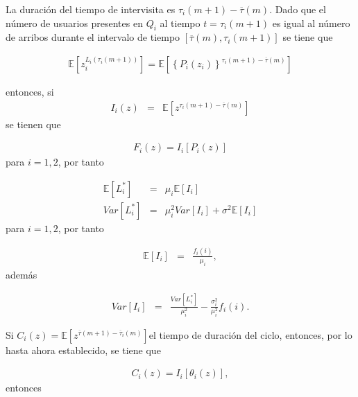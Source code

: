 \documentclass{article}
\newcommand{\esp}{\mathbb{E}}
\numberwithin{equation}{section}
\begin{document}
La duraci\'on del tiempo de intervisita es $\tau_{i}\left(m+1\right)-\overline{\tau}\left(m\right)$. Dado que el n\'umero de usuarios presentes en $Q_{i}$ al tiempo $t=\tau_{i}\left(m+1\right)$ es igual al n\'umero de arribos durante el intervalo de tiempo $\left[\overline{\tau}\left(m\right),\tau_{i}\left(m+1\right)\right]$ se tiene que


\begin{eqnarray*}
\esp\left[z_{i}^{L_{i}\left(\tau_{i}\left(m+1\right)\right)}\right]=\esp\left[\left\{P_{i}\left(z_{i}\right)\right\}^{\tau_{i}\left(m+1\right)-\overline{\tau}\left(m\right)}\right]
\end{eqnarray*}

entonces, si \begin{eqnarray*}I_{i}\left(z\right)&=&\esp\left[z^{\tau_{i}\left(m+1\right)-\overline{\tau}\left(m\right)}\right]\end{eqnarray*} se tienen que

\begin{eqnarray*}
F_{i}\left(z\right)=I_{i}\left[P_{i}\left(z\right)\right]
\end{eqnarray*}
para $i=1,2$, por tanto



\begin{eqnarray*}
\esp\left[L_{i}^{*}\right]&=&\mu_{i}\esp\left[I_{i}\right]\\
Var\left[L_{i}^{*}\right]&=&\mu_{i}^{2}Var\left[I_{i}\right]+\sigma^{2}\esp\left[I_{i}\right]
\end{eqnarray*}
para $i=1,2$, por tanto


\begin{eqnarray*}
\esp\left[I_{i}\right]&=&\frac{f_{i}\left(i\right)}{\mu_{i}},
\end{eqnarray*}
adem\'as

\begin{eqnarray*}
Var\left[I_{i}\right]&=&\frac{Var\left[L_{i}^{*}\right]}{\mu_{i}^{2}}-\frac{\sigma_{i}^{2}}{\mu_{i}^{2}}f_{i}\left(i\right).
\end{eqnarray*}


Si  $C_{i}\left(z\right)=\esp\left[z^{\overline{\tau}\left(m+1\right)-\overline{\tau}_{i}\left(m\right)}\right]$el tiempo de duraci\'on del ciclo, entonces, por lo hasta ahora establecido, se tiene que

\begin{eqnarray*}
C_{i}\left(z\right)=I_{i}\left[\theta_{i}\left(z\right)\right],
\end{eqnarray*}
entonces
\end{document}
